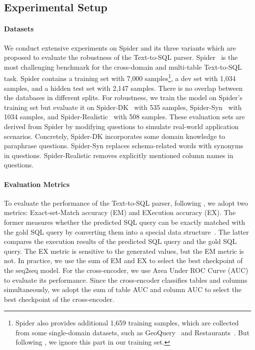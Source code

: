 \documentclass[letterpaper]{article} \usepackage{aaai23}  \usepackage{times}  \usepackage{helvet}  \usepackage{courier}  \usepackage[hyphens]{url}  \usepackage{graphicx} \urlstyle{rm} \def\UrlFont{\rm}  \usepackage{natbib}  \usepackage{caption} \frenchspacing  \setlength{\pdfpagewidth}{8.5in}  \setlength{\pdfpageheight}{11in}  \usepackage{algorithm}
\begin{document}
\subsection{Experimental Setup}
\paragraph{Datasets}
We conduct extensive experiments on Spider and its three variants which are proposed to evaluate the robustness of the Text-to-SQL parser. Spider~\citep{tao2018spider} is the most challenging benchmark for the cross-domain and multi-table Text-to-SQL task. 
Spider contains a training set with 7,000 samples\footnote{Spider also provides additional 1,659 training samples, which are collected from some single-domain datasets, such as GeoQuery~\citep{john1996learning} and Restaurants~\citep{alessandra2012automatic}. But following \citep{torsten2021picard}, we ignore this part in our training set.}, a dev set with 1,034 samples, and a hidden test set with 2,147 samples. There is no overlap between the databases in different splits. For robustness, we train the model on Spider's training set but evaluate it on Spider-DK~\citep{yujian2021exploring} with 535 samples, Spider-Syn~\citep{yujian2021towards} with 1034 samples, and Spider-Realistic~\citep{xiang2021structure} with 508 samples. These evaluation sets are derived from Spider by modifying questions to simulate real-world application scenarios. Concretely, Spider-DK incorporates some domain knowledge to paraphrase questions. Spider-Syn replaces schema-related words with synonyms in questions. Spider-Realistic removes explicitly mentioned column names in questions.
 
\paragraph{Evaluation Metrics} 
To evaluate the performance of the Text-to-SQL parser, following \citealp{tao2018spider, ruiqi2020semantic}, we adopt two metrics: Exact-set-Match accuracy (EM) and EXecution accuracy (EX). The former measures whether the predicted SQL query can be exactly matched with the gold SQL query by converting them into a special data structure~\citep{tao2018spider}. The latter compares the execution results of the predicted SQL query and the gold SQL query. The EX metric is sensitive to the generated values, but the EM metric is not. In practice, we use the sum of EM and EX to select the best checkpoint of the seq2seq model. For the cross-encoder, we use Area Under ROC Curve (AUC) to evaluate its performance. Since the cross-encoder classifies tables and columns simultaneously, we adopt the sum of table AUC and column AUC to select the best checkpoint of the cross-encoder.
\end{document}
